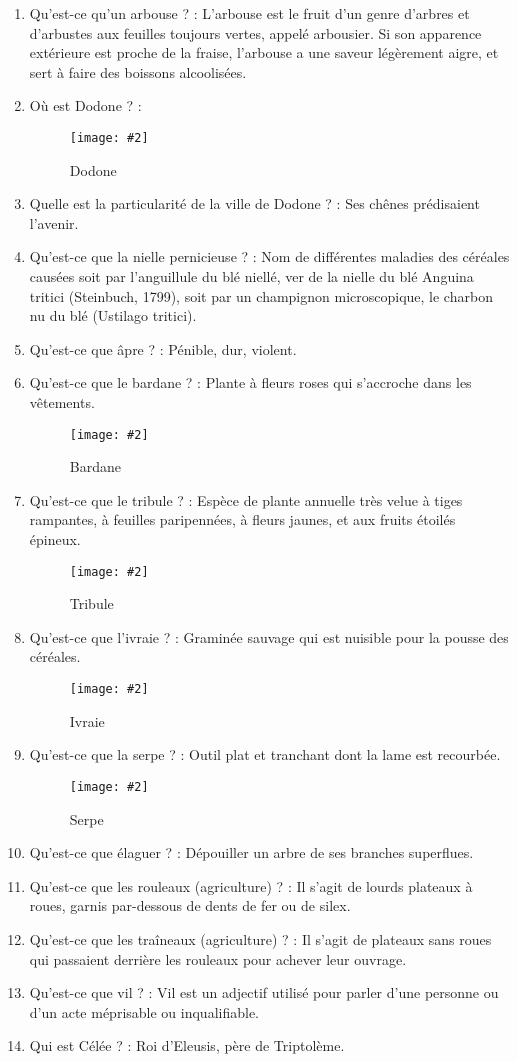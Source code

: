 \documentclass[a4paper, 11pt, hidelinks]{article}
\newcommand{\img}[4]{\begin{figure}[!ht]
    \centering
    \texttt{[image: \#2]}
    \caption{#3}
    \label{#4}
    \end{figure} }
\begin{document}
\begin{enumerate}
      \item Qu'est-ce qu'un arbouse ? : L'arbouse est le fruit d'un genre d'arbres et d'arbustes aux feuilles toujours vertes, appelé arbousier.
            Si son apparence extérieure est proche de la fraise, l'arbouse a une saveur légèrement aigre, et sert à faire des boissons alcoolisées.
      \item Où est Dodone ? :
            \img{0.3}{Dodone.png}{Dodone}{26}
      \item Quelle est la particularité de la ville de Dodone ? : Ses chênes prédisaient l'avenir.
      \item Qu'est-ce que la nielle pernicieuse ? : Nom de différentes maladies des céréales causées soit par l’anguillule du blé niellé, ver de la nielle du blé Anguina tritici (Steinbuch, 1799), soit par un champignon microscopique, le charbon nu du blé (Ustilago tritici).
      \item Qu'est-ce que âpre ? : Pénible, dur, violent.
      \item Qu'est-ce que le bardane ? : Plante à fleurs roses qui s'accroche dans les vêtements.
            \img{0.5}{Bardane.jpg}{Bardane}{27}
      \item Qu'est-ce que le tribule ? : Espèce de plante annuelle très velue à tiges rampantes, à feuilles paripennées, à fleurs jaunes, et aux fruits étoilés épineux.
            \img{0.5}{Tribule.jpg}{Tribule}{28}
      \item Qu'est-ce que l'ivraie ? : Graminée sauvage qui est nuisible pour la pousse des céréales.
            \img{0.5}{Ivraie.jpg}{Ivraie}{29}
      \item Qu'est-ce que la serpe ? : Outil plat et tranchant dont la lame est recourbée.
            \img{0.5}{Serpe.jpg}{Serpe}{30}
      \item Qu'est-ce que élaguer ? : Dépouiller un arbre de ses branches superflues.
      \item Qu'est-ce que les rouleaux (agriculture) ? : Il s'agit de lourds plateaux à roues, garnis par-dessous de dents de fer ou de silex.
      \item Qu'est-ce que les traîneaux (agriculture) ? : Il s'agit de plateaux sans roues qui passaient derrière les rouleaux pour achever leur ouvrage.
      \item Qu'est-ce que vil ? : Vil est un adjectif utilisé pour parler d'une personne ou d'un acte méprisable ou inqualifiable.
      \item Qui est Célée ? : Roi d'Eleusis, père de Triptolème.

\end{enumerate}
\end{document}

